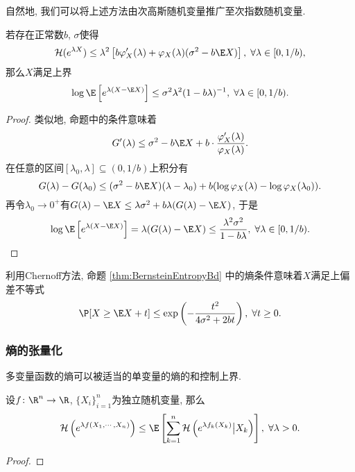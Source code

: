 自然地, 我们可以将上述方法由次高斯随机变量推广至次指数随机变量. 
\begin{proposition}[Bernstein熵的界]\label{thm:BernsteinEntropyBd}
	若存在正常数$b$, $\sigma$使得
	\begin{equation*}
		\cH(e^{\lambda X}) 
		\leq \lambda^2 \left[ b \varphi_X'(\lambda) + \varphi_X(\lambda)(\sigma^2 - b \E X) \right],\;
		\forall \lambda \in [0, 1/b), 
	\end{equation*}
	那么$X$满足上界
	\begin{equation*}
		\log \E \left[ e^{\lambda(X - \E X)}\right] 
		\leq \sigma^2 \lambda^2 (1 - b \lambda)^{-1},\; 
		\forall \lambda \in [0, 1/b). 
	\end{equation*}
\end{proposition}
\begin{proof}
	类似地, 命题中的条件意味着
	\begin{equation*}
		G'(\lambda) 
		\leq \sigma^2 - b \E X + b \cdot \frac{\varphi_X'(\lambda)}{\varphi_X(\lambda)}. 
	\end{equation*}
	在任意的区间$[\lambda_0, \lambda] \subseteq (0, 1/b)$上积分有
	\begin{equation*}
		G(\lambda) - G(\lambda_0) 
		\leq (\sigma^2 - b \E X)(\lambda - \lambda_0) + b(\log \varphi_X(\lambda) - \log \varphi_X(\lambda_0)). 
	\end{equation*}
	再令$\lambda_0 \to 0^+$有$G(\lambda) - \E X \leq \lambda \sigma^2 + b \lambda (G(\lambda) - \E X)$, 于是
	\begin{equation*}
		\log \E\left[e^{\lambda(X - \E X)}\right]
		= \lambda(G(\lambda) - \E X)
		\leq \frac{\lambda^2 \sigma^2}{1 - b \lambda} ,\; 
		\forall \lambda \in [0, 1/b). 
	\end{equation*}
\end{proof}
\begin{corollary}
	利用Chernoff方法, 命题 \ref{thm:BernsteinEntropyBd} 中的熵条件意味着$X$满足上偏差不等式
	\begin{equation*}
		\P[X \geq \E X + t] 
		\leq \exp \left(- \frac{t^2}{4 \sigma^2 + 2b t} \right),\;
		\forall t \geq 0. 
	\end{equation*}
\end{corollary}

\subsubsection{熵的张量化}

多变量函数的熵可以被适当的单变量的熵的和控制上界. 
\begin{lemma}[熵的张量化]
	设$f \colon \R^n \to \R$, $\{X_i\}_{i=1}^n$为独立随机变量, 那么
	\begin{equation*}
		\cH\left(e^{\lambda f(X_1, \cdots, X_n)}\right)
		\leq \E \left[ \sum_{k=1}^n \cH \left(e^{\lambda f_k(X_k)} \big| X_k \right) \right],\; 
		\forall \lambda > 0. 
	\end{equation*}
\end{lemma}
\begin{proof}
	
\end{proof}


